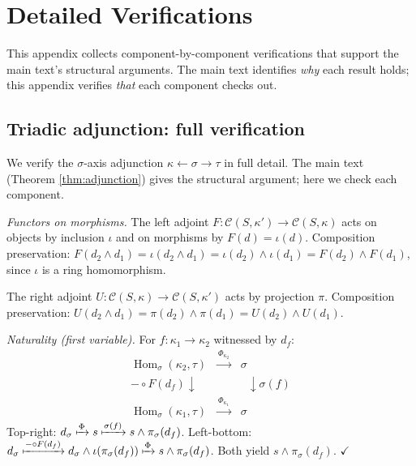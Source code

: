 \section{Detailed Verifications}\label{app:verifications}

This appendix collects component-by-component verifications
that support the main text's structural arguments. The main
text identifies \emph{why} each result holds; this appendix
verifies \emph{that} each component checks out.

\subsection{Triadic adjunction: full verification}
\label{app:adjunction-full}

We verify the $\sigma$-axis adjunction
$\kappa \leftarrow \sigma \to \tau$ in full detail.
The main text (Theorem \ref{thm:adjunction}) gives
the structural argument; here we check each component.

\emph{Functors on morphisms.}
The left adjoint $F: \mathcal{C}(S,\kappa') \to
\mathcal{C}(S,\kappa)$ acts on objects by inclusion
$\iota$ and on morphisms by
$F(d) = \iota(d)$. Composition preservation:
$F(d_2 \wedge d_1) = \iota(d_2 \wedge d_1) =
\iota(d_2) \wedge \iota(d_1) = F(d_2) \wedge F(d_1)$,
since $\iota$ is a ring homomorphism.

The right adjoint $U: \mathcal{C}(S,\kappa) \to
\mathcal{C}(S,\kappa')$ acts by projection $\pi$.
Composition preservation:
$U(d_2 \wedge d_1) = \pi(d_2) \wedge \pi(d_1) =
U(d_2) \wedge U(d_1)$.

\emph{Naturality (first variable).}
For $f: \kappa_1 \to \kappa_2$ witnessed by $d_f$:
\[
\begin{array}{ccc}
  \operatorname{Hom}_\sigma(\kappa_2, \tau)
  & \xrightarrow{\;\Phi_{\kappa_2}\;} & \sigma \\[6pt]
  {\scriptstyle{- \circ F(d_f)}}\downarrow\phantom{x} & &
  \phantom{x}\downarrow{\scriptstyle{\sigma(f)}} \\[6pt]
  \operatorname{Hom}_\sigma(\kappa_1, \tau)
  & \xrightarrow{\;\Phi_{\kappa_1}\;} & \sigma
\end{array}
\]
Top-right: $d_\sigma \xmapsto{\Phi} s \xmapsto{\sigma(f)}
s \wedge \pi_\sigma(d_f)$.
Left-bottom: $d_\sigma \xmapsto{- \circ F(d_f)}
d_\sigma \wedge \iota(\pi_\sigma(d_f)) \xmapsto{\Phi}
s \wedge \pi_\sigma(d_f)$.
Both yield $s \wedge \pi_\sigma(d_f)$. $\checkmark$

